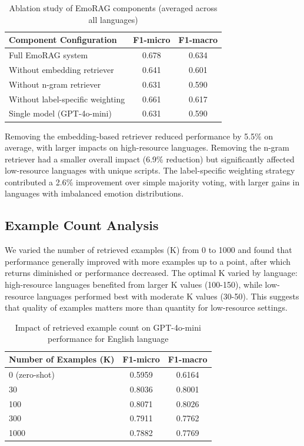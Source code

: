 \documentclass[a4paper,12pt]{extarticle}
\begin{document}
\begin{table}[h]
\centering
\begin{tabular}{lcc}
\toprule
\textbf{Component Configuration} & \textbf{F1-micro} & \textbf{F1-macro} \\
\midrule
Full EmoRAG system & 0.678 & 0.634 \\
Without embedding retriever & 0.641 & 0.601 \\
Without n-gram retriever & 0.631 & 0.590 \\
Without label-specific weighting & 0.661 & 0.617 \\
Single model (GPT-4o-mini) & 0.631 & 0.590 \\
\bottomrule
\end{tabular}
\caption{Ablation study of EmoRAG components (averaged across all languages)}
\label{tab:ablation_components}
\end{table}

Removing the embedding-based retriever reduced performance by 5.5\% on average, with larger impacts on high-resource languages. Removing the n-gram retriever had a smaller overall impact (6.9\% reduction) but significantly affected low-resource languages with unique scripts. The label-specific weighting strategy contributed a 2.6\% improvement over simple majority voting, with larger gains in languages with imbalanced emotion distributions.

\subsection{Example Count Analysis}


We varied the number of retrieved examples (K) from 0 to 1000 and found that performance generally improved with more examples up to a point, after which returns diminished or performance decreased. The optimal K varied by language: high-resource languages benefited from larger K values (100-150), while low-resource languages performed best with moderate K values (30-50). This suggests that quality of examples matters more than quantity for low-resource settings.

\begin{table}[h]
\centering
\begin{tabular}{lcc}
\toprule
\textbf{Number of Examples (K)} & \textbf{F1-micro} & \textbf{F1-macro} \\
\midrule
0 (zero-shot) & 0.5959 & 0.6164 \\
30 & 0.8036 & 0.8001 \\
100 & 0.8071 & 0.8026 \\
300 & 0.7911 & 0.7762 \\
1000 & 0.7882 & 0.7769 \\
\bottomrule
\end{tabular}
\caption{Impact of retrieved example count on GPT-4o-mini performance for English language}
\label{tab:example_count}
\end{table}
\end{document}
